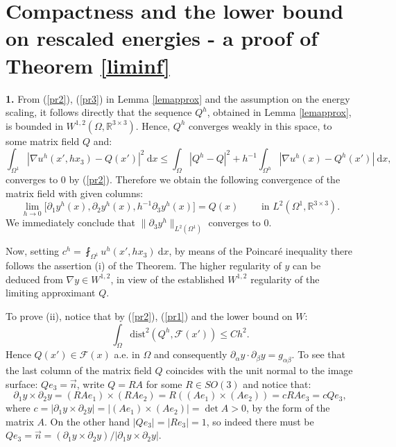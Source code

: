 \documentclass[leqno,twoside, 11pt]{amsart}
\theoremstyle{plain}
\theoremstyle{definition}
\numberwithin{equation}{section}
\numberwithin{figure}{section}
\begin{document}
\section{Compactness and the lower bound on rescaled energies
- a proof of Theorem \ref{liminf}}\label{secliminf}

{\bf 1.} From (\ref{pr2}), (\ref{pr3}) in Lemma \ref{lemapprox}
and the assumption on the energy scaling, 
it follows directly that the sequence $Q^h$, obtained in Lemma \ref{lemapprox},
is bounded in $W^{1,2}(\Omega,\mathbb{R}^{3\times 3})$. 
Hence, $Q^h$ converges weakly in this space, to some matrix field $Q$ and:
\begin{equation*}
\int_{\Omega^1}|\nabla u^h(x',hx_3) - Q(x')|^2~\mbox{d}x
\leq \int_{\Omega}|Q^h - Q|^2 + h^{-1}\int_{\Omega^h}|\nabla u^h(x) - Q^h(x')|
~\mbox{d}x,
\end{equation*}
converges to $0$ by (\ref{pr2}).
Therefore we obtain the following convergence of the matrix field with 
given columns:
$$ \lim_{h\to 0}\Big[\partial_1 y^h(x), \partial_2 y^h(x),
h^{-1}\partial_3 y^h(x)\Big] = Q(x) \qquad \mbox{ in } 
L^2(\Omega^1,\mathbb{R}^{3\times 3}).$$
We immediately conclude that $\|\partial_3 y^h\|_{L^2(\Omega^1)}$ converges to $0$.

Now, setting $c^h = \fint_{\Omega^1} u^h(x',hx_3)~\mbox{d}x$, by means of 
the Poincar\'e inequality there follows the assertion (i) of the Theorem.
The higher regularity of $y$ can be deduced from $\nabla y \in W^{1,2}$,
in view of the established $W^{1,2}$
regularity of the limiting approximant $Q$.

To prove (ii), notice that by (\ref{pr2}),  (\ref{pr1}) and the lower bound on $W$:
\begin{equation}\label{pr4}
\int_\Omega\mbox{dist}^2(Q^h, \mathcal{F}(x')) \leq Ch^2.
\end{equation}
Hence $Q(x')\in\mathcal{F}(x)$ a.e. in $\Omega$ and consequently 
$\partial_\alpha y \cdot \partial_\beta y = g_{\alpha\beta}$. 
To see that the last column of the matrix field $Q$ coincides with the unit 
normal to the image surface: $Qe_3=\vec n$, write $Q=RA$ for some $R\in SO(3)$
and notice that:
$$\partial_1 y\times \partial_2 y = (RAe_1)\times (RAe_2)
= R((Ae_1)\times (Ae_2)) = c RAe_3 = cQe_3, $$
where $c= |\partial_1y \times\partial_2 y| = |(Ae_1)\times (Ae_2)|
= \det A >0$, by the form of the matrix $A$. 
On the other hand $|Qe_3| = |Re_3|=1$, so indeed there must be $Qe_3=\vec n
=  (\partial_1y \times\partial_2 y) / |\partial_1y \times\partial_2 y| $.
\end{document}
